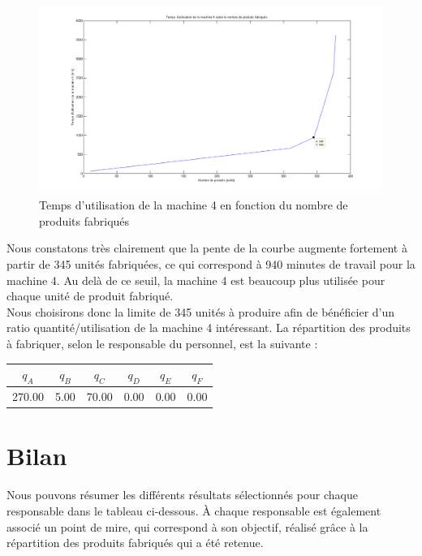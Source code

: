 \documentclass[paper=a4, fontsize=11pt]{report}
\numberwithin{equation}{section}		%
\numberwithin{figure}{section}			%
\numberwithin{table}{section}				%
\begin{document}
\begin{figure}[H]
\caption{Temps d'utilisation de la machine 4 en fonction du nombre de produits fabriqués}
\centering
\includegraphics[width=16cm]{figures/graphe-personnel.png}
\end{figure}

Nous constatons très clairement que la pente de la courbe augmente fortement à partir de 345 unités fabriquées, ce qui correspond à 940 minutes de travail pour la machine 4. Au delà de ce seuil, la machine 4 est beaucoup plus utilisée pour chaque unité de produit fabriqué.\\

Nous choisirons donc la limite de 345 unités à produire afin de bénéficier d'un ratio quantité/utilisation de la machine 4 intéressant. La répartition des produits à fabriquer, selon le responsable du personnel, est la suivante : 

\begin{center}
\begin{tabular}{cccccc}
\hline
$q_A$ & $q_B$ & $q_C$ & $q_D$ & $q_E$ & $q_F$ \\
\hline
270.00 & 5.00 & 70.00 & 0.00 & 0.00 & 0.00 \\
\hline
\end{tabular}
\end{center}

\section{Bilan}

Nous pouvons résumer les différents résultats sélectionnés pour chaque responsable dans le tableau ci-dessous. À chaque responsable est également associé un point de mire, qui correspond à son objectif, réalisé grâce à la répartition des produits fabriqués qui a été retenue.
\end{document}
